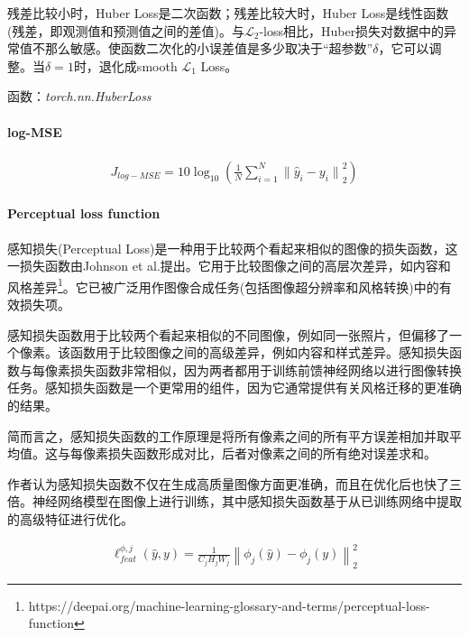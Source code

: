 \documentclass[letterpaper,12pt]{article}
\begin{document}
	残差比较小时，Huber Loss是二次函数；残差比较大时，Huber Loss是线性函数(残差，即观测值和预测值之间的差值)。与$\mathcal{L}_2$-loss相比，Huber损失对数据中的异常值不那么敏感。使函数二次化的小误差值是多少取决于“超参数”$\delta$，它可以调整。当$\delta=1$时，退化成smooth $\mathcal{L}_1$ Loss。
	
	函数：\textit{torch.nn.HuberLoss}
	
	\paragraph{log-MSE}
	
	\begin{equation}
		\begin{aligned}
			J_{log-MSE} = 10\log_{10}\left(\frac{1}{N} \sum_{i=1}^{N} {\| \hat{y}_i - y_i \|}_{2}^2 \right)
		\end{aligned}
	\end{equation}
	
	\paragraph{Perceptual loss function}
	
	感知损失(Perceptual Loss)是一种用于比较两个看起来相似的图像的损失函数，这一损失函数由Johnson et al.\cite{johnson2016perceptual}提出。它用于比较图像之间的高层次差异，如内容和风格差异\footnote{https://deepai.org/machine-learning-glossary-and-terms/perceptual-loss-function}。它已被广泛用作图像合成任务(包括图像超分辨率和风格转换)中的有效损失项。
	
	感知损失函数用于比较两个看起来相似的不同图像，例如同一张照片，但偏移了一个像素。该函数用于比较图像之间的高级差异，例如内容和样式差异。感知损失函数与每像素损失函数非常相似，因为两者都用于训练前馈神经网络以进行图像转换任务。感知损失函数是一个更常用的组件，因为它通常提供有关风格迁移的更准确的结果。
	
	简而言之，感知损失函数的工作原理是将所有像素之间的所有平方误差相加并取平均值。这与每像素损失函数形成对比，后者对像素之间的所有绝对误差求和\cite{johnson2016perceptual}。
	
	作者认为感知损失函数不仅在生成高质量图像方面更准确，而且在优化后也快了三倍。神经网络模型在图像上进行训练，其中感知损失函数基于从已训练网络中提取的高级特征进行优化。
	
	\begin{equation}
		\begin{aligned}
			\ell_{feat}^{\phi,j} (\hat{y},y) = \frac{1}{C_{j}H_{j}W_{j}}{\left\| \phi_{j}(\hat{y})-\phi_{j}(y)\right\|}_{2}^2
		\end{aligned}
		\label{eq: perceptual loss}
	\end{equation}
	
\end{document}
